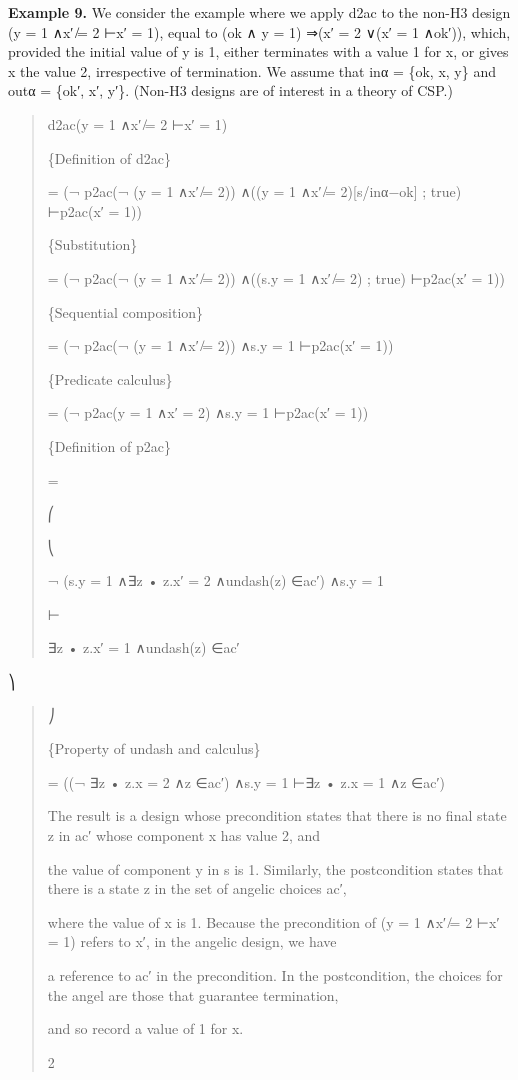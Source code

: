 \documentclass[11pt]{article}
\begin{document}
\noindent\textbf{Example 9.} We consider the example where we apply d2ac to the non-H3 design (y = 1 ∧x′ ̸= 2 ⊢x′ = 1), equal to (ok ∧ y = 1) ⇒(x′ = 2 ∨(x′ = 1 ∧ok′)), which, provided the initial value of y is 1, either terminates with a value 1 for x, or gives x the value 2, irrespective of termination. We assume that inα = \{ok, x, y\} and outα = \{ok′, x′, y′\}. (Non-H3 designs are of interest in a theory of CSP.)


\begin{quote}\small\raggedright
d2ac(y = 1 ∧x′ ̸= 2 ⊢x′ = 1)
\par
\{Definition of d2ac\}
\par
= (¬ p2ac(¬ (y = 1 ∧x′ ̸= 2)) ∧((y = 1 ∧x′ ̸= 2)[s/inα−ok] ; true) ⊢p2ac(x′ = 1))
\par
\{Substitution\}
\par
= (¬ p2ac(¬ (y = 1 ∧x′ ̸= 2)) ∧((s.y = 1 ∧x′ ̸= 2) ; true) ⊢p2ac(x′ = 1))
\par
\{Sequential composition\}
\par
= (¬ p2ac(¬ (y = 1 ∧x′ ̸= 2)) ∧s.y = 1 ⊢p2ac(x′ = 1))
\par
\{Predicate calculus\}
\par
= (¬ p2ac(y = 1 ∧x′ = 2) ∧s.y = 1 ⊢p2ac(x′ = 1))
\par
\{Definition of p2ac\}
\par
=
\par
⎛
\par
⎝
\par
¬ (s.y = 1 ∧∃z • z.x′ = 2 ∧undash(z) ∈ac′) ∧s.y = 1
\par
⊢
\par
∃z • z.x′ = 1 ∧undash(z) ∈ac′
\end{quote}

⎞

\begin{quote}\small\raggedright
⎠
\par
\{Property of undash and calculus\}
\par
= ((¬ ∃z • z.x = 2 ∧z ∈ac′) ∧s.y = 1 ⊢∃z • z.x = 1 ∧z ∈ac′)
\par
The result is a design whose precondition states that there is no final state z in ac′ whose component x has value 2, and
\par
the value of component y in s is 1. Similarly, the postcondition states that there is a state z in the set of angelic choices ac′,
\par
where the value of x is 1. Because the precondition of (y = 1 ∧x′ ̸= 2 ⊢x′ = 1) refers to x′, in the angelic design, we have
\par
a reference to ac′ in the precondition. In the postcondition, the choices for the angel are those that guarantee termination,
\par
and so record a value of 1 for x.
\par
2
\end{quote}
\end{document}
